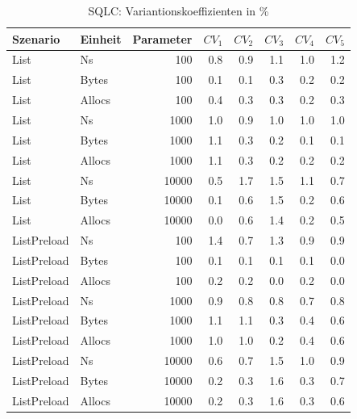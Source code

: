 
\begin{table}[ht]
\setlength{\extrarowheight}{-1pt}
\centering
\caption{SQLC: Variantionskoeffizienten in \%}
\begin{tabular}{llrrrrrr}
\toprule
Szenario & Einheit & Parameter & ${CV_1}$ & ${CV_2}$ & ${CV_3}$& ${CV_4}$ & ${CV_5}$ \\
\midrule
	List & Ns & 100 &  0.8 &  0.9 &  1.1 &  1.0 &  1.2 \\
	List & Bytes & 100 &  0.1 &  0.1 &  0.3 &  0.2 &  0.2 \\
	List & Allocs & 100 &  0.4 &  0.3 &  0.3 &  0.2 &  0.3 \\
	List & Ns & 1000 &  1.0 &  0.9 &  1.0 &  1.0 &  1.0 \\
	List & Bytes & 1000 &  1.1 &  0.3 &  0.2 &  0.1 &  0.1 \\
	List & Allocs & 1000 &  1.1 &  0.3 &  0.2 &  0.2 &  0.2 \\
	List & Ns & 10000 &  0.5 &  1.7 &  1.5 &  1.1 &  0.7 \\
	List & Bytes & 10000 &  0.1 &  0.6 &  1.5 &  0.2 &  0.6 \\
	List & Allocs & 10000 &  0.0 &  0.6 &  1.4 &  0.2 &  0.5 \\
	ListPreload & Ns & 100 &  1.4 &  0.7 &  1.3 &  0.9 &  0.9 \\
	ListPreload & Bytes & 100 &  0.1 &  0.1 &  0.1 &  0.1 &  0.0 \\
	ListPreload & Allocs & 100 &  0.2 &  0.2 &  0.0 &  0.2 &  0.0 \\
	ListPreload & Ns & 1000 &  0.9 &  0.8 &  0.8 &  0.7 &  0.8 \\
	ListPreload & Bytes & 1000 &  1.1 &  1.1 &  0.3 &  0.4 &  0.6 \\
	ListPreload & Allocs & 1000 &  1.0 &  1.0 &  0.2 &  0.4 &  0.6 \\
	ListPreload & Ns & 10000 &  0.6 &  0.7 &  1.5 &  1.0 &  0.9 \\
	ListPreload & Bytes & 10000 &  0.2 &  0.3 &  1.6 &  0.3 &  0.7 \\
	ListPreload & Allocs & 10000 &  0.2 &  0.3 &  1.6 &  0.3 &  0.6 \\
\bottomrule
\end{tabular}
\label{tab:variationskoeffizienten_sqlc}
\end{table}
	